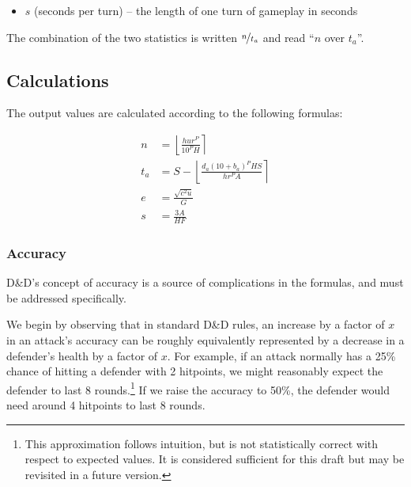 \documentclass[twocolumn]{article}
\begin{document}
\begin{itemize}
    \item $s$ (seconds per turn) -- the length of one turn of gameplay in seconds
\end{itemize}


The combination of the two statistics is written $\nicefrac{n}{t_a}$
and read ``$n$ over $t_a$''.

\subsection{Calculations}

The output values are calculated according to the following formulas:

\begin{align*}
    n   &=  
        \left\lfloor
            \frac
                {h u r^P}
                {10^P H}
        \right\rceil \\[2ex]
    t_a &=
        S -
        \left\lfloor
            \frac
                {d_a (10 + b_{a})^P H S}
                {h r^P A}
        \right\rceil \\[2ex]
    e   &=
        \frac
            {\sqrt{c^2 u}}
            {G} \\[2ex]
    s   &=
        \frac
            {3 A}
            {H F}
\end{align*}

\subsubsection{Accuracy}

D\&D's concept of accuracy is a source of complications in the formulas,
and must be addressed specifically.

We begin by observing that in standard D\&D rules,
an increase by a factor of $x$ in an attack's accuracy
can be roughly equivalently represented by a decrease in a defender's
health by a factor of $x$.
For example, if an attack normally has a 25\% chance of hitting a defender with 2 hitpoints,
we might reasonably expect the defender to last 8 rounds.\footnote{
    This approximation follows intuition,
    but is not statistically correct with respect to expected values.
    It is considered sufficient for this draft
    but may be revisited in a future version.
}
If we raise the accuracy to 50\%,
the defender would need around 4 hitpoints to last 8 rounds.
\end{document}
